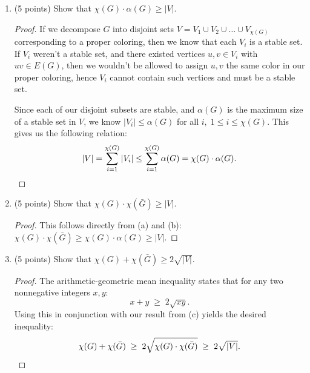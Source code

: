 \documentclass[11pt]{article}
\newcommand{\n}{\vspace{0.3cm}}
\begin{document}
\begin{enumerate}
\begin{enumerate}[label=(\alph*)]
\begin{proof}
            Let \(G'\) be a subgraph of \(\bar G\) with vertex set \(V'\).  Since \(xy \in E(G')\) for all \(x,y \in V(G')\), we have that \(G' = K_{|V'|}\), so \(\chi(G') = |V'| = \alpha(G)\).  Finally, since \(G' \subseteq \bar G\), we can conclude that 
            \[\chi(\bar G) \geq \chi(G') = \alpha(G). \qedhere\]
          \end{proof}
          

        \item (5 points) Show that \(\chi(G) \cdot \alpha(G) \geq |V|\).
          \begin{proof}
            If we decompose \(G\) into disjoint sets \(V = V_1 \cup V_2 \cup \hdots \cup V_{\chi(G)}\) corresponding to a proper coloring, then we know that each \(V_i\) is a stable set. If \(V_i\) weren't a stable set, and there existed vertices \(u,v \in V_i\) with \(uv \in E(G)\), then we wouldn't be allowed to assign \(u,v\) the same color in our proper coloring, hence \(V_i\) cannot contain such vertices and must be a stable set. \n

            Since each of our disjoint subsets are stable, and \(\alpha(G)\) is the maximum size of a stable set in \(V\), we know \(|V_i| \leq \alpha(G)\) for all \(i, \; 1 \leq i \leq \chi(G)\).  This gives us the following relation:
            \[|V| = \sum_{i=1}^{\chi(G)} |V_i| \leq \sum_{i=1}^{\chi(G)} \alpha(G) = \chi(G) \cdot \alpha(G). \qedhere\]
          \end{proof}
          

        \item (5 points) Show that \(\chi(G) \cdot \chi(\bar G) \geq |V|\).
          \begin{proof}
            This follows directly from (a) and (b): \(\chi(G) \cdot \chi(\bar G) \geq \chi(G) \cdot \alpha(G) \geq |V|\).
          \end{proof}
          

        \item (5 points) Show that \(\chi(G) + \chi(\bar G) \geq 2 \sqrt{|V|}\).
          \begin{proof}
            The arithmetic-geometric mean inequality states that for any two nonnegative integers \(x,y\):
            \[x + y \;\geq\; 2 \sqrt{xy}.\]
            Using this in conjunction with our result from (c) yields the desired inequality:
            \[\chi(G) + \chi(\bar G) \;\geq\; 2 \sqrt{\chi(G) \cdot \chi(\bar G)} \;\geq\; 2 \sqrt{|V|}. \qedhere\]
          \end{proof}
          

\end{enumerate}
\end{enumerate}
\end{document}
